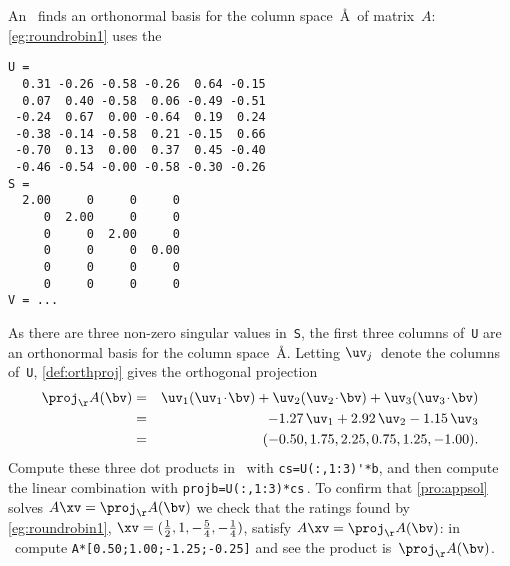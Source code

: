 \begin{example}
An \svd\ finds an orthonormal basis for the column space~\AA\ of matrix~\(A\): \autoref{eg:roundrobin1} uses the \svd\ \twodp
\setbox\ajrqrbox\hbox{}%
\marginpar{\usebox{\ajrqrbox\\[2ex]}}%
\begin{verbatim}
U =
  0.31 -0.26 -0.58 -0.26  0.64 -0.15
  0.07  0.40 -0.58  0.06 -0.49 -0.51
 -0.24  0.67  0.00 -0.64  0.19  0.24
 -0.38 -0.14 -0.58  0.21 -0.15  0.66
 -0.70  0.13  0.00  0.37  0.45 -0.40
 -0.46 -0.54 -0.00 -0.58 -0.30 -0.26
S =
  2.00     0     0     0
     0  2.00     0     0
     0     0  2.00     0
     0     0     0  0.00
     0     0     0     0
     0     0     0     0
V = ...
\end{verbatim}
As there are three non-zero singular values in~\verb|S|, the first three columns of~\verb|U| are an orthonormal basis for the column space~\AA.
Letting \(\uv_j\)~denote the columns of~\verb|U|, \autoref{def:orthproj} gives the orthogonal projection \twodp
\begin{eqnarray*}
\proj_\AA(\bv)
&=&\uv_1(\uv_1\cdot\bv)+\uv_2(\uv_2\cdot\bv)+\uv_3(\uv_3\cdot\bv)
\\&=&-1.27\,\uv_1+2.92\,\uv_2-1.15\,\uv_3
\\&=&(-0.50,1.75,2.25,0.75,1.25,-1.00).
\end{eqnarray*}
Compute these three dot products in \script\ with \verb|cs=U(:,1:3)'*b|, and then compute the linear combination with \verb|projb=U(:,1:3)*cs|\,.
To confirm that \autoref{pro:appsol} solves \(A\xv=\proj_\AA(\bv)\) we check that the ratings found by \autoref{eg:roundrobin1}, \(\xv=(\frac12,1,-\frac54,-\frac14)\), satisfy \(A\xv=\proj_\AA(\bv)\): in \script\ compute \verb|A*[0.50;1.00;-1.25;-0.25]| and see the product is~\(\proj_\AA(\bv)\).
\end{example}


